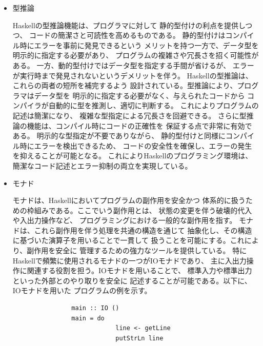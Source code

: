 \documentclass{cssspaper}
\begin{document}
\begin{itemize}
                \item 型推論
            
                Haskellの型推論機能は、プログラマに対して
                静的型付けの利点を提供しつつ、
                コードの簡潔さと可読性を高めるものである。
                静的型付けはコンパイル時にエラーを事前に発見できるという
                メリットを持つ一方で、データ型を明示的に指定する必要があり、
                プログラムの複雑さや冗長さを招く可能性がある。
                一方、動的型付けではデータ型を指定する手間が省けるが、
                エラーが実行時まで発見されないというデメリットを伴う。
                Haskellの型推論は、これらの両者の短所を補完するよう
                設計されている。型推論により、プログラマはデータ型を
                明示的に指定する必要がなく、与えられたコードから
                コンパイラが自動的に型を推測し、適切に判断する。
                これによりプログラムの記述は簡潔になり、
                複雑な型指定による冗長さを回避できる。
                さらに型推論の機能は、コンパイル時にコードの正確性を
                保証する点で非常に有効である。
                明示的な型指定が不要でありながら、
                静的型付けと同様にコンパイル時にエラーを検出できるため、
                コードの安全性を確保し、エラーの発生を抑えることが可能となる。
                これによりHaskellのプログラミング環境は、
                簡潔なコード記述とエラー抑制の両立を実現している。

                \item モナド
                
                モナドは、Haskellにおいてプログラムの副作用を安全かつ
                体系的に扱うための枠組みである。ここでいう副作用とは、
                状態の変更を伴う破壊的代入や入出力操作など、
                プログラミングにおける一般的な副作用を指す。
                モナドは、これら副作用を伴う処理を共通の構造を通じて
                抽象化し、その構造に基づいた演算子を用いることで一貫して
                扱うことを可能にする。これにより、副作用を安全に
                管理するための強力なツールを提供している。
                特にHaskellで頻繁に使用されるモナドの一つがIOモナドであり、
                主に入出力操作に関連する役割を担う。IOモナドを用いることで、
                標準入力や標準出力といった外部とのやり取りを安全に
                記述することが可能である。以下に、IOモナドを用いた
                プログラムの例を示す。

                \begin{lstlisting}
                main :: IO ()
                main = do
                            line <- getLine
                            putStrLn line
                \end{lstlisting}


\end{itemize}
\end{document}
